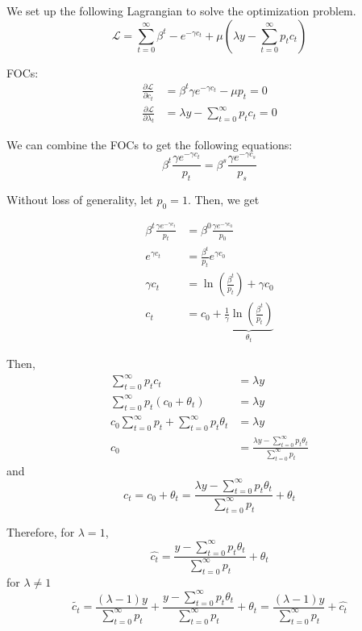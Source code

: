 \documentclass[12pt]{article}
\theoremstyle{definition}
\begin{document}
We set up the following Lagrangian to solve the optimization problem.
\[
\mathcal{L} = 
\sum_{t=0}^{\infty}\beta^t -e^{-\gamma c_t}  + \mu( \lambda y-\sum_{t=0}^{\infty} p_t c_t)
\]

FOCs:
\[
\begin{split}
\frac{\partial \mathcal{L}}{\partial c_t} &= \beta^t \gamma e^{-\gamma c_t}-\mu p_t = 0 \\
\frac{\partial \mathcal{L}}{\partial \lambda_t} &= \lambda y- \sum_{t=0}^{\infty} p_t c_t = 0
\end{split}
\]

We can combine the FOCs to get the following equations:
\[
	\beta^t \frac{\gamma e^{-\gamma c_t}}{p_t} = \beta^s \frac{\gamma e^{-\gamma c_s}}{p_s}
\]

Without loss of generality, let $p_0=1$. Then, we get

\[
\begin{split}
\beta^t \frac{\gamma e^{-\gamma c_t}}{p_t} & = \beta^0 \frac{\gamma e^{-\gamma c_0}}{p_0}\\
e^{\gamma c_t} & = \frac{\beta^t}{p_t} e^{\gamma c_0} \\
\gamma c_t & = \ln{\left( \frac{\beta^t}{p_t}\right) } +\gamma c_0 \\
c_t & = c_0 + \underbrace{\frac{1}{\gamma}\ln{\left( \frac{\beta^t}{p_t}\right) }}_{\theta_t}
\end{split}
\]

Then,
\[
\begin{split}
\sum_{t=0}^{\infty} p_t c_t & = \lambda y \\
\sum_{t=0}^{\infty} p_t \left( c_0 +\theta_t\right)  & = \lambda y \\
c_0 \sum_{t=0}^{\infty} p_t  + \sum_{t=0}^{\infty} p_t \theta_t & = \lambda y \\
c_0 & = \frac{\lambda y - \sum_{t=0}^{\infty} p_t \theta_t}{\sum_{t=0}^{\infty} p_t}
\end{split}
\]
and
\[
c_t = c_0 + \theta_t = \frac{\lambda y - \sum_{t=0}^{\infty} p_t \theta_t}{\sum_{t=0}^{\infty} p_t} + \theta_t 
\]

Therefore, for $\lambda=1$,
\[
\hat{c_t} = \frac{y - \sum_{t=0}^{\infty} p_t \theta_t}{\sum_{t=0}^{\infty} p_t} + \theta_t 
\]
for $\lambda\neq 1$
\[
\tilde{c_t} = \frac{(\lambda-1)y}{\sum_{t=0}^{\infty} p_t} + \frac{y - \sum_{t=0}^{\infty} p_t \theta_t}{\sum_{t=0}^{\infty} p_t} + \theta_t  = \frac{(\lambda-1)y}{\sum_{t=0}^{\infty} p_t} + \hat{c_t}
\]
\end{document}

